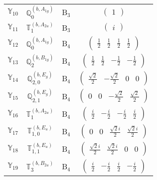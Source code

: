 \documentclass[fleqn,10pt,landscape]{article}
\begin{document}
\begin{itemize}
\begin{center}
\begin{longtable}{c|c|c|c}
$ \mathbb{Y}_{10} $ & $\mathbb{Q}_{0}^{(b,A_{1g})}$ & B$_{3}$ & $\begin{pmatrix} 1 \end{pmatrix}$ \\
$ \mathbb{Y}_{11} $ & $\mathbb{T}_{1}^{(b,A_{2u})}$ & B$_{3}$ & $\begin{pmatrix} i \end{pmatrix}$ \\ \hline
$ \mathbb{Y}_{12} $ & $\mathbb{Q}_{0}^{(b,A_{1g})}$ & B$_{4}$ & $\begin{pmatrix} \frac{1}{2} & \frac{1}{2} & \frac{1}{2} & \frac{1}{2} \end{pmatrix}$ \\
$ \mathbb{Y}_{13} $ & $\mathbb{Q}_{2}^{(b,B_{1g})}$ & B$_{4}$ & $\begin{pmatrix} \frac{1}{2} & \frac{1}{2} & - \frac{1}{2} & - \frac{1}{2} \end{pmatrix}$ \\
$ \mathbb{Y}_{14} $ & $\mathbb{Q}_{2,0}^{(b,E_{g})}$ & B$_{4}$ & $\begin{pmatrix} \frac{\sqrt{2}}{2} & - \frac{\sqrt{2}}{2} & 0 & 0 \end{pmatrix}$ \\
$ \mathbb{Y}_{15} $ & $\mathbb{Q}_{2,1}^{(b,E_{g})}$ & B$_{4}$ & $\begin{pmatrix} 0 & 0 & - \frac{\sqrt{2}}{2} & \frac{\sqrt{2}}{2} \end{pmatrix}$ \\
$ \mathbb{Y}_{16} $ & $\mathbb{T}_{1}^{(b,A_{2u})}$ & B$_{4}$ & $\begin{pmatrix} \frac{i}{2} & - \frac{i}{2} & - \frac{i}{2} & \frac{i}{2} \end{pmatrix}$ \\
$ \mathbb{Y}_{17} $ & $\mathbb{T}_{1,0}^{(b,E_{u})}$ & B$_{4}$ & $\begin{pmatrix} 0 & 0 & \frac{\sqrt{2} i}{2} & \frac{\sqrt{2} i}{2} \end{pmatrix}$ \\
$ \mathbb{Y}_{18} $ & $\mathbb{T}_{1,1}^{(b,E_{u})}$ & B$_{4}$ & $\begin{pmatrix} \frac{\sqrt{2} i}{2} & \frac{\sqrt{2} i}{2} & 0 & 0 \end{pmatrix}$ \\
$ \mathbb{Y}_{19} $ & $\mathbb{T}_{3}^{(b,B_{2u})}$ & B$_{4}$ & $\begin{pmatrix} \frac{i}{2} & - \frac{i}{2} & \frac{i}{2} & - \frac{i}{2} \end{pmatrix}$ \\
\end{longtable}
\end{center}


\end{itemize}
\end{document}
